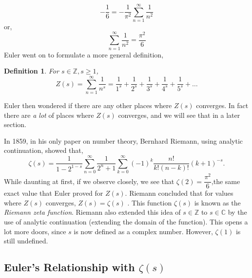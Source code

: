 \documentclass[12pt]{article}
\theoremstyle{plain}
\newtheorem{definition}{Definition}
\newcommand{\Z}{\mathbb{Z}}
\newcommand{\C}{\mathbb{C}}
\begin{document}
	\[ 	-\frac{1}{6} = -\frac{1}{\pi^2} \sum\limits_{n=1}^{\infty} \frac{1}{n^2} \]
	or, 
	\[ \sum\limits_{n=1}^{\infty} \frac{1}{n^2} = \frac{\pi^2}{6} \]
	Euler went on to formulate a more general definition, 
	\begin{definition}
		For $ s \in \Z, s \geq 1 $,
			\[ Z(s) = \sum\limits_{n=1}^{\infty} \frac{1}{n^s} = \frac{1}{1^s} + \frac{1}{2^s} + \frac{1}{3^s} + \frac{1}{4^s} + \frac{1}{5^s} + \ldots \]
	\end{definition}
	Euler then wondered if there are any other places where $ Z(s) $ converges. In fact there are \textit{a lot} of places where $ Z(s) $ converges, and we will see that in a later section.
	
	In 1859, in his only paper on number theory, Bernhard Riemann, using analytic continuation, showed that,
	\[ \zeta(s) = \frac{1}{1 - 2^{1-s}} \sum\limits_{n=0}^{\infty} \frac{1}{2^n+1} \sum\limits_{k=0}^{\infty} (-1)^k \frac{n!}{k!(n-k)!}(k+1)^{-s}. \]
	While daunting at first, if we observe closely, we see that $ \zeta(2) = \dfrac{\pi^2}{6} $,the same exact value that Euler proved for $ Z(s) $. Riemann concluded that for values where $ Z(s) $ converges, $ Z(s) = \zeta(s) $ \cite{riemann}. This function $ \zeta(s) $ is known as the \textit{Riemann zeta function}. Riemann also extended this idea of $ s \in \Z $ to $ s \in \C $ by the use of analytic continuation (extending the domain of the function). This opens a lot more doors, since $ s $ is now defined as a complex number. However, $ \zeta(1) $ is still undefined.
	
	\subsection{Euler's Relationship with $ \zeta(s) $}
	
\end{document}

